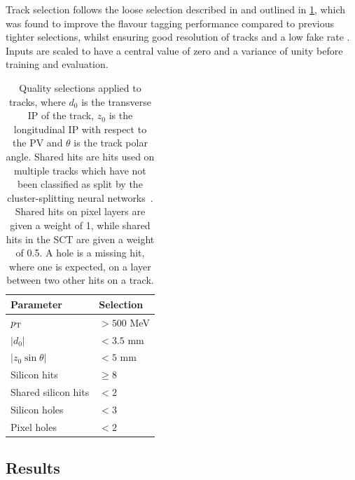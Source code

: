 Track selection follows the loose selection described in  and outlined in \cref{tab:fake_track_mva_selections}, which was found to improve the flavour tagging performance compared to previous tighter selections, whilst ensuring good resolution of tracks and a low fake rate \cite{PERF-2015-08}.
Inputs are scaled to have a central value of zero and a variance of unity before training and evaluation.

\begin{table}[!htbp]
  \footnotesize\centering
  \setlength{\tabcolsep}{0.5em} %
  \begin{tabular}{ll}
    \toprule\hline
    \textbf{Parameter} & \textbf{Selection} \\
    \hline
    $p_{\text{T}}$                & $> 500$ MeV \\
    $|d_0|$              & $< 3.5$ mm \\
    $|z_0 \sin\theta|$   & $< 5$ mm \\
    Silicon hits         & $\ge 8$ \\
    Shared silicon hits  & $< 2$ \\
    Silicon holes        & $< 3$ \\
    Pixel holes          & $< 2$ \\
    \hline\bottomrule
  \end{tabular}
  \caption{
    Quality selections applied to tracks,
    where $d_0$ is the transverse IP of the track, $z_0$ is the longitudinal IP with respect to the PV and $\theta$ is the track polar angle.
    Shared hits are hits used on multiple tracks which have not been classified as split by the cluster-splitting neural networks~\cite{PERF-2015-08}.
    Shared hits on pixel layers are given a weight of 1, while shared hits in the SCT are given a weight of 0.5.
    A hole is a missing hit, where one is expected, on a layer between two other hits on a track.
    }
  \vspace{4mm}
  \label{tab:fake_track_mva_selections}
\end{table}




\subsection{Results}\label{sec:fake_track_mva_results}


